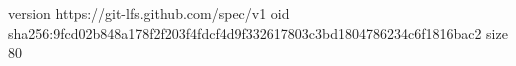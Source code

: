 version https://git-lfs.github.com/spec/v1
oid sha256:9fcd02b848a178f2f203f4fdcf4d9f332617803c3bd1804786234c6f1816bac2
size 80
